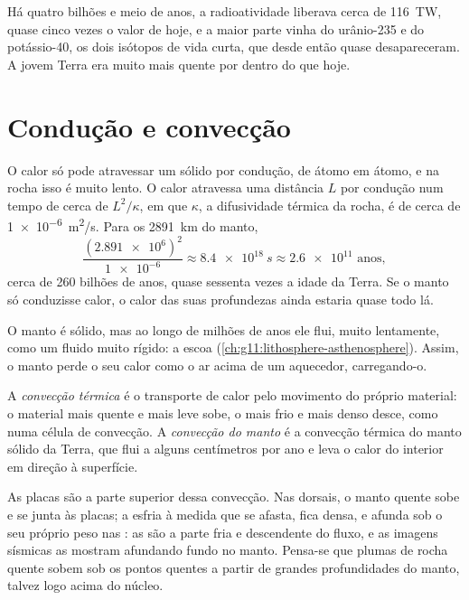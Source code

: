 Há quatro bilhões e meio de anos, a radioatividade liberava cerca de
\qty{116}{TW}, quase cinco vezes o valor de hoje, e a maior parte vinha do
urânio-235 e do potássio-40, os dois isótopos de vida curta, que desde então
quase desapareceram. A jovem Terra era muito mais quente por dentro do que
hoje.

\section{Condução e convecção}

O calor só pode atravessar um sólido por condução, de átomo em átomo, e na
rocha isso é muito lento. O calor atravessa uma distância $L$ por condução
num tempo de cerca de $L^2/\kappa$, em que $\kappa$, a difusividade térmica
da rocha, é de cerca de \qty{1e-6}{m^2/s}. Para os
\qty{2891}{km} do manto,
\[
  \frac{(\num{2.891e6})^2}{\num{1e-6}} \approx \qty{8.4e18}{s} \approx
  \num{2.6e11} \text{ anos},
\]
cerca de 260 bilhões de anos, quase sessenta vezes a idade da Terra. Se o
manto só conduzisse calor, o calor das suas profundezas ainda estaria quase
todo lá.

O manto é sólido, mas ao longo de milhões de anos ele flui, muito
lentamente, como um fluido muito rígido: a  escoa
(\cref{ch:g11:lithosphere-asthenosphere}). Assim, o manto perde o seu calor
como o ar acima de um aquecedor, carregando-o.

\begin{definition}\label{def:g12:internal-heat:convection}
A \emph{convecção térmica} é o transporte de calor
pelo movimento do próprio material: o material mais quente e mais leve sobe,
o mais frio e mais denso desce, como numa célula de convecção. A
\emph{convecção do manto} é a convecção térmica do
manto sólido da Terra, que flui a alguns centímetros por ano e leva o calor
do interior em direção à superfície.
\end{definition}

As placas são a parte superior dessa convecção. Nas dorsais, o manto quente
sobe e se junta às placas; a  esfria à medida que se afasta, fica
densa, e afunda sob o seu próprio peso nas : as  são
a parte fria e descendente do fluxo, e as imagens sísmicas as mostram
afundando fundo no manto. Pensa-se que plumas de rocha quente sobem sob os
pontos quentes a partir de grandes profundidades do manto, talvez logo
acima do núcleo.

